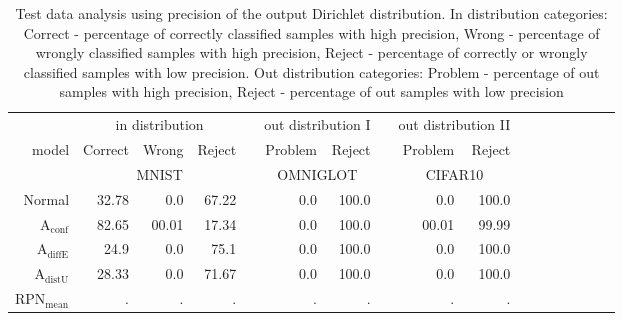 \begin{table}[ht]
	\centering
	\caption{Test data analysis using precision of the output Dirichlet distribution. In distribution categories: Correct - percentage of correctly classified samples with high precision,
	Wrong - percentage of wrongly classified samples with high precision, Reject - percentage of correctly or wrongly classified samples with low precision. Out distribution categories:
	Problem - percentage of out samples with high precision, Reject - percentage of out samples with low precision }
	\begin{tiny}
        \begin{tabular}{@{}rrrrrrrcrrrrcrrrr@{}}
        \toprule
		& \multicolumn{3}{c}{in distribution} & & \multicolumn{2}{c}{out distribution I} & & \multicolumn{2}{c}{out distribution II} \\
		model & Correct & Wrong & Reject & &  Problem & Reject &  & Problem & Reject \\
        \midrule
		& \multicolumn{3}{c}{MNIST} & & \multicolumn{2}{c}{OMNIGLOT} & & \multicolumn{2}{c}{CIFAR10} \\
		Normal & 32.78 & 0.0 & 67.22 & & 0.0 & 100.0 && 0.0 & 100.0 \\
		$\mathrm{A}_{\mathrm{conf}}$ & 82.65 & 00.01 & 17.34 && 0.0 & 100.0 && 00.01 & 99.99 \\
		$\mathrm{A}_{\mathrm{diffE}}$ & 24.9 & 0.0 & 75.1 & & 0.0 & 100.0 & & 0.0 & 100.0 \\  
		$\mathrm{A}_{\mathrm{distU}}$ & 28.33 & 0.0 & 71.67 & & 0.0 & 100.0 & & 0.0 & 100.0 \\
		$\mathrm{RPN}_{\mathrm{mean}}$ & . & . & . & & . & . & & . & . \\
        \end{tabular}
	\end{tiny}
	\label{tab:precision based data analysis}
\end{table}








